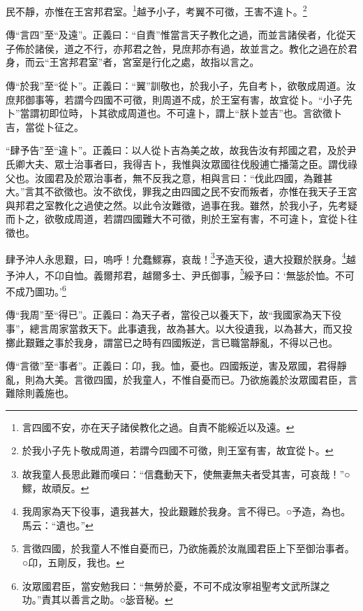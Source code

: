 民不靜，亦惟在王宮邦君室。\footnote{言四國不安，亦在天子諸侯教化之過。自責不能綏近以及遠。}越予小子，考翼不可徵，王害不違卜。\footnote{於我小子先卜敬成周道，若謂今四國不可徵，則王室有害，故宜從卜。}

{\noindent\zhuan{}\fzbyks 傳“言四”至“及遠”。正義曰：“自責”惟當言天子教化之過，而並言諸侯者，化從天子佈於諸侯，道之不行，亦邦君之咎，見庶邦亦有過，故並言之。教化之過在於君身，而云“王宮邦君室”者，宮室是行化之處，故指以言之。 \par}

{\noindent\zhuan{}\fzbyks 傳“於我”至“從卜”。正義曰：“翼”訓敬也，於我小子，先自考卜，欲敬成周道。汝庶邦御事等，若謂今四國不可徵，則周道不成，於王室有害，故宜從卜。“小子先卜”當謂初即位時，卜其欲成周道也。不可違卜，謂上“朕卜並吉”也。言欲徵卜吉，當從卜征之。 \par}

{\noindent\shu{}\fzkt “肆予告”至“違卜”。正義曰：以人從卜吉為美之故，故我告汝有邦國之君，及於尹氏卿大夫、眾士治事者曰，我得吉卜，我惟與汝眾國往伐殷逋亡播蕩之臣。謂伐祿父也。汝國君及於眾治事者，無不反我之意，相與言曰：“伐此四國，為難甚大。”言其不欲徵也。汝不欲伐，罪我之由四國之民不安而叛者，亦惟在我天子王宮與邦君之室教化之過使之然。以此令汝難徵，過事在我。雖然，於我小子，先考疑而卜之，欲敬成周道，若謂四國難大不可徵，則於王室有害，不可違卜，宜從卜往徵也。 \par}

肆予沖人永思艱，曰，嗚呼！允蠢鰥寡，哀哉！\footnote{故我童人長思此難而嘆曰：“信蠢動天下，使無妻無夫者受其害，可哀哉！”○鰥，故頑反。}予造天役，遺大投艱於朕身。\footnote{我周家為天下役事，遺我甚大，投此艱難於我身。言不得已。○予造，為也。馬云：“遺也。”}越予沖人，不卬自恤。義爾邦君，越爾多士、尹氏御事，\footnote{言徵四國，於我童人不惟自憂而已，乃欲施義於汝胤國君臣上下至御治事者。○卬，五剛反，我也。}綏予曰：‘無毖於恤。不可不成乃圖功。’\footnote{汝眾國君臣，當安勉我曰：“無勞於憂，不可不成汝寧祖聖考文武所謀之功。”責其以善言之助。○毖音秘。}


{\noindent\zhuan{}\fzbyks 傳“我周”至“得已”。正義曰：為天子者，當役己以養天下，故“我國家為天下役事”，總言周家當救天下。此事遺我，故為甚大。以大役遺我，以為甚大，而又投擲此艱難之事於我身，謂當已之時有四國叛逆，言已職當靜亂，不得以己也。 \par}

{\noindent\zhuan{}\fzbyks 傳“言徵”至“事者”。正義曰：卬，我。恤，憂也。四國叛逆，害及眾國，君得靜亂，則為大美。言徵四國，於我童人，不惟自憂而已。乃欲施義於汝眾國君臣，言難除則義施也。 \par}

